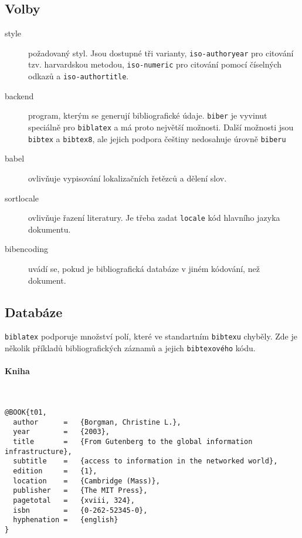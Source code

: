 \documentclass[a4paper,10pt]{ltxdockit}
\def\t|#1|{\texttt{#1}}
\def\c#1{%
\hangpara{3em}{1}%
\fullcite{#1}}
\begin{document}
\subsection{Volby}
\begin{description}
\item[style] požadovaný styl. Jsou dostupné tři varianty, \t|iso-authoryear| pro citování tzv. harvardskou metodou, \t|iso-numeric| pro citování pomocí číselných odkazů a \t|iso-authortitle|.
\item[backend] program, kterým se generují bibliografické údaje. \t|biber| je vyvinut speciálně pro \t|biblatex| a má proto největší možnosti. Další možnosti jsou \t|bibtex| a \t|bibtex8|, ale jejich podpora češtiny nedosahuje úrovně \t|biberu|
\item[babel] ovlivňuje vypisování lokalizačních řetězců a dělení slov.
\item[sortlocale] ovlivňuje řazení literatury. Je třeba zadat \t|locale| kód hlavního jazyka dokumentu.
\item[bibencoding] uvádí se, pokud je bibliografická databáze v jiném kódování, než dokument. 

\end{description}


\subsection{Databáze}

\t|biblatex| podporuje množství polí, které ve standartním \t|bibtexu| chyběly. Zde je několik příkladů bibliografických záznamů a jejich \t|bibtexového| kódu.


\paragraph{Kniha} \hfill\\

\c{t01}
\begin{verbatim}
@BOOK{t01,
  author      =   {Borgman, Christine L.}, 
  year        =   {2003},
  title       =   {From Gutenberg to the global information infrastructure}, 
  subtitle    =   {access to information in the networked world},
  edition     =   {1},
  location    =   {Cambridge (Mass)}, 
  publisher   =   {The MIT Press},
  pagetotal   =   {xviii, 324},
  isbn        =   {0-262-52345-0},
  hyphenation =   {english}
}
\end{verbatim} 
\end{document}
